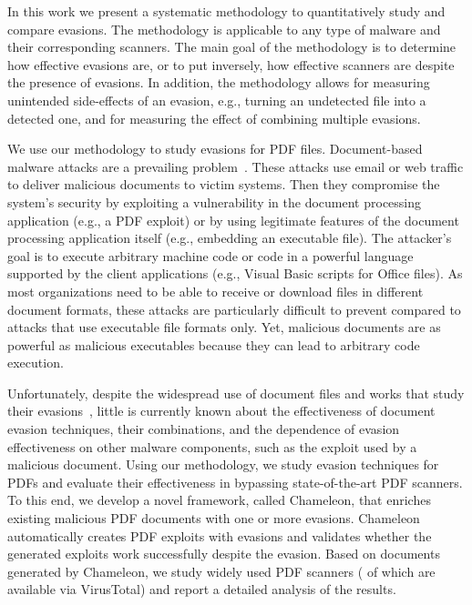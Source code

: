 In this work we present a systematic methodology to quantitatively study and compare evasions.
The methodology is applicable to any type of malware and their corresponding scanners.
The main goal of the methodology is to determine how effective evasions are, or to put inversely, how effective scanners are despite the presence of evasions.
In addition, the methodology allows for measuring unintended side-effects of an evasion, e.g., turning an undetected file into a detected one, and for measuring the effect of combining multiple evasions.

We use our methodology to study evasions for PDF files.
Document-based malware attacks are a prevailing problem~\cite{pdf_cve_statistics, officeonrise, exploit_CVE_2018_4990}. These attacks use email or web traffic to deliver malicious documents to victim systems. Then they compromise the system's security by exploiting a vulnerability in the document processing application (e.g., a PDF exploit) or by using legitimate features of the document processing application itself (e.g., embedding an executable file). The attacker's goal is to execute arbitrary machine code or code in a powerful language supported by the client applications (e.g., Visual Basic scripts for Office files). As most organizations need to be able to receive or download files in different document formats, these attacks are particularly difficult to prevent compared to attacks that use executable file formats only. Yet, malicious documents are as powerful as malicious executables because they can lead to arbitrary code execution.

Unfortunately, despite the widespread use of document files and works that study their evasions~\cite{carmony2016extract, Maiorca2013, xu2016automatically, Dang2017, zhang2016adversarial, biggio2013evasion, laskov2014practical},
little is currently known about the effectiveness of document evasion techniques, their combinations, and the dependence of evasion effectiveness on other malware components, such as the exploit used by a malicious document.
Using our methodology, we study evasion techniques for PDFs 
and evaluate their effectiveness in bypassing state-of-the-art PDF scanners.
To this end, we develop a novel framework, called Chameleon, that enriches existing malicious 
PDF documents with one or more evasions.
Chameleon automatically creates PDF exploits with evasions and validates whether the generated exploits work successfully despite the evasion.
Based on \nbSamplesSize{} documents generated by Chameleon, we study 
\nbAnalyzers{} widely used PDF scanners (\nbVirusTotalEngines{} of which are available via VirusTotal) and report a detailed analysis of the results.

